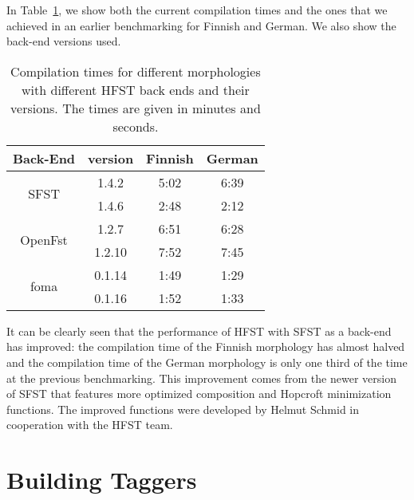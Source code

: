 \documentclass{llncs}
\begin{document}
In Table~\ref{tab:compilation_times_versions}, we show both the current compilation 
times and the ones that we achieved in an earlier benchmarking \cite{linden/2011/sfcm} for 
Finnish and German. We also show the back-end versions used.

\begin{table} [h!]
  \centering
  \caption{Compilation times for different morphologies with
    different HFST back ends and their versions. 
    The times are given in minutes and seconds.}
  \begin{tabular}{| c | c | c | c |}
    \hline
    Back-End                 & version  & Finnish  & German \\ \hline\hline
    \multirow{2}{*}{SFST}    & 1.4.2    & 5:02     & 6:39 \\
    & 1.4.6    & 2:48     & 2:12 \\ \hline
    \multirow{2}{*}{OpenFst} & 1.2.7    & 6:51     & 6:28 \\
    & 1.2.10   & 7:52     & 7:45 \\ \hline
    \multirow{2}{*}{foma}    & 0.1.14   & 1:49     & 1:29 \\
    & 0.1.16   & 1:52     & 1:33 \\
    \hline
  \end{tabular}
  \label{tab:compilation_times_versions}
\end{table}

It can be clearly seen that the performance of HFST with SFST as a back-end 
has improved: the compilation time of the Finnish morphology has almost
halved and the compilation time of the German morphology is only one third of the
time at the previous benchmarking. 
This improvement comes from the newer version of SFST that features more optimized
composition and Hopcroft minimization functions. The improved functions 
were developed by Helmut Schmid in cooperation with the HFST team.



\section{Building Taggers}\label{PosTools}
\end{document}
